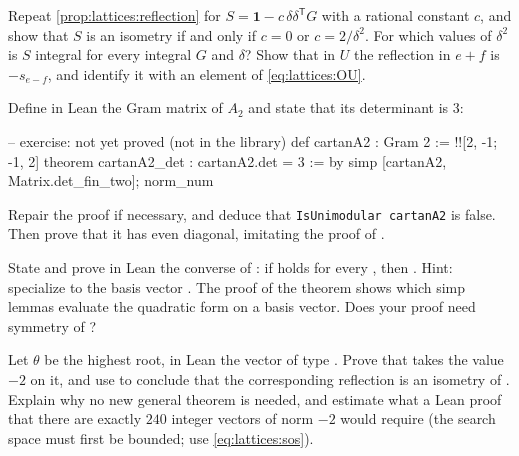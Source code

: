 \begin{exercise}\label{ex:lattices:otherrefl}
Repeat \cref{prop:lattices:reflection} for $S=\mathbf1-c\,\delta\delta^{\mathsf T}G$ with a
rational constant $c$, and show that $S$ is an isometry if and only if $c=0$ or
$c=2/\delta^2$. For which values of $\delta^2$ is $S$ integral for every integral $G$ and
$\delta$? Show that in $U$ the reflection in $e+f$ is $-s_{e-f}$, and identify it with an
element of \eqref{eq:lattices:OU}.
\end{exercise}

\begin{exercise}\label{ex:lattices:leanA2}
Define in Lean the Gram matrix of $A_2$ and state that its determinant is $3$:
\begin{leancode}
-- exercise: not yet proved (not in the library)
def cartanA2 : Gram 2 := !![2, -1; -1, 2]
theorem cartanA2_det : cartanA2.det = 3 := by
  simp [cartanA2, Matrix.det_fin_two]; norm_num
\end{leancode}
Repair the proof if necessary, and deduce that \texttt{IsUnimodular cartanA2} is false. Then prove that it has even diagonal, imitating
the proof of .
\end{exercise}

\begin{exercise}\label{ex:lattices:leanconverse}
State and prove in Lean the converse of : if
 holds for every , then . Hint:
specialize to the basis vector . The proof of the theorem
 shows which simp lemmas evaluate the quadratic form on a
basis vector. Does your proof need symmetry of ?
\end{exercise}

\begin{exercise}\label{ex:lattices:leanhighest}
Let $\theta$ be the highest root, in Lean the vector \lean{![2, 3, 4, 5, 6, 4, 2, 3]} of
type . Prove that  takes the value $-2$ on it, and
use  to conclude that the corresponding reflection is an
isometry of . Explain why no new general theorem
is needed, and estimate what a Lean proof that there are exactly $240$ integer vectors of
norm $-2$ would require (the search space must first be bounded; use
\eqref{eq:lattices:sos}).
\end{exercise}

